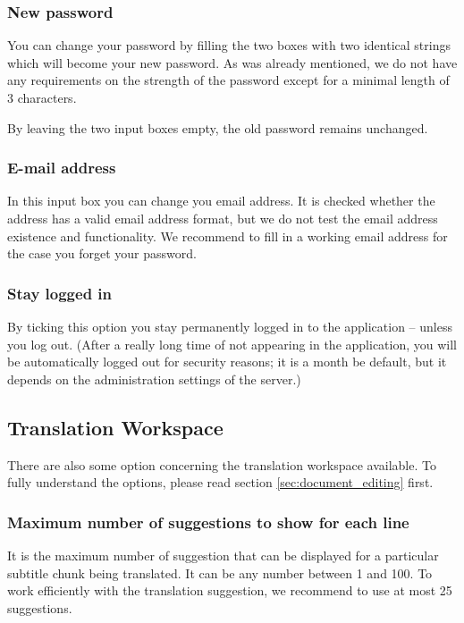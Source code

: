 \subsubsection{New password}

You can change your password by filling the two boxes with two identical strings which will become your new password. As was already mentioned, we do not have any requirements on the strength of the password except for a minimal length of 3 characters.

By leaving the two input boxes empty, the old password remains unchanged.

\subsubsection{E-mail address}

In this input box you can change you email address. It is checked whether the address has a valid email address format, but we do not test the email address existence and functionality. We recommend to fill in a working email address for the case you forget your password.

\subsubsection{Stay logged in}

By ticking this option you stay permanently logged in to the application -- unless you log out. (After a really long time of not appearing in the application, you will be automatically logged out for security reasons; it is a month be default, but it depends on the administration settings of the server.)

\subsection{Translation Workspace}

There are also some option concerning the translation workspace available. To fully understand the options, please read section \ref{sec:document_editing} first.

\subsubsection{Maximum number of suggestions to show for each line}

It is the maximum number of suggestion that can be displayed for a particular subtitle chunk being translated. It can be any number between 1 and 100. To work efficiently with the translation suggestion, we recommend to use at most 25 suggestions.

